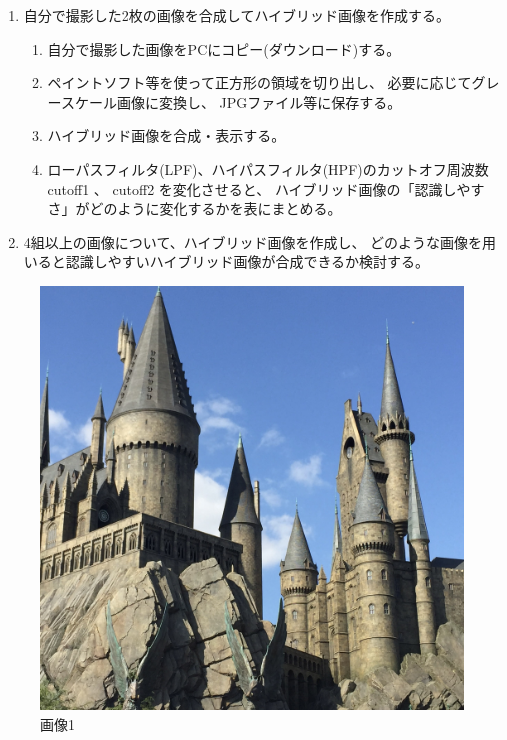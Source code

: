 \documentclass[12pt]{jarticle}
\begin{document}
\begin{enumerate}
    \item 自分で撮影した2枚の画像を合成してハイブリッド画像を作成する。
          \begin{enumerate}
              \item 自分で撮影した画像をPCにコピー(ダウンロード)する。
              \item ペイントソフト等を使って正方形の領域を切り出し、
                    必要に応じてグレースケール画像に変換し、
                    JPGファイル等に保存する。
              \item ハイブリッド画像を合成・表示する。
              \item ローパスフィルタ(LPF)、ハイパスフィルタ(HPF)のカットオフ周波数 cutoff1 、 cutoff2 を変化させると、
                    ハイブリッド画像の「認識しやすさ」がどのように変化するかを表にまとめる。
          \end{enumerate}
    \item 4組以上の画像について、ハイブリッド画像を作成し、
          どのような画像を用いると認識しやすいハイブリッド画像が合成できるか検討する。
\end{enumerate}

\begin{figure}[h]
    \begin{center}
        \includegraphics[scale=0.06]{kadai4_3_1.jpg}
    \end{center}
    \caption{画像1}
\end{figure}
\end{document}
